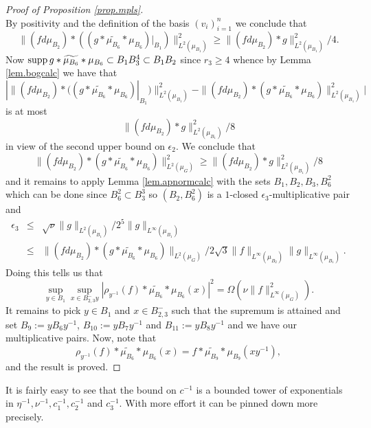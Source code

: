 \documentclass[12pt]{amsart}
\numberwithin{equation}{section}
\theoremstyle{plain}
\theoremstyle{definition}
\renewcommand{\leq}{\leqslant}
\renewcommand{\geq}{\geqslant}
\providecommand{\supp}{\mathop{\rm supp}\nolimits}
\begin{document}
\begin{proof}[Proof of Proposition \ref{prop.mpls}]
\begin{equation*}
\end{equation*}
By positivity and the definition of the basis $(v_i)_{i=1}^n$ we conclude that
\begin{equation*}
\|(fd\mu_{B_2}) \ast ((g \ast \widetilde{\mu_{B_6}} \ast \mu_{B_6})|_{B_1})\|_{L^2(\mu_{B_1})}^2\geq \|(fd\mu_{B_2}) \ast g \|_{L^2(\mu_{B_1})}^2/4.
\end{equation*}
Now $\supp g \ast \widetilde{\mu_{B_6}} \ast \mu_{B_6}\subset B_1B_3^4 \subset B_1B_2$ since $r_3 \geq 4$ whence by Lemma \ref{lem.bogcalc} we have that
\begin{equation*}
|\|(fd\mu_{B_2}) \ast ((g \ast \widetilde{\mu_{B_6}} \ast \mu_{B_6})|_{B_1})\|_{L^2(\mu_{B_1})}^2-\|(fd\mu_{B_2}) \ast (g \ast \widetilde{\mu_{B_6}} \ast \mu_{B_6})\|_{L^2(\mu_{B_1})}^2|
\end{equation*}
is at most
\begin{equation*}
\|(fd\mu_{B_2}) \ast g \|_{L^2(\mu_{B_1})}^2/8
\end{equation*}
in view of the second upper bound on $\epsilon_2$.  We conclude that
\begin{equation*}
\|(fd\mu_{B_2}) \ast (g \ast \widetilde{\mu_{B_6}} \ast \mu_{B_6})\|_{L^2(\mu_{G})}^2\geq \|(fd\mu_{B_2}) \ast g \|_{L^2(\mu_{B_1})}^2/8
\end{equation*}
and it remains to apply Lemma \ref{lem.apnormcalc} with the sets $B_1,B_2,B_3,B_6^2$ which can be done since $B_6^2\subset B_3^{3}$ so $(B_2,B_6^2)$ is a $1$-closed $\epsilon_3$-multiplicative pair and
\begin{eqnarray*}
\epsilon_3 & \leq & \sqrt{\nu}\|g\|_{L^2(\mu_{B_1})}/2^5\|g\|_{L^\infty(\mu_{B_1})}\\ & \leq & \|(fd\mu_{B_2}) \ast (g \ast \widetilde{\mu_{B_6}} \ast \mu_{B_6})\|_{L^2(\mu_{G})}/2\sqrt{3}\|f\|_{L^\infty(\mu_{B_2})}\|g\|_{L^\infty(\mu_{B_1})}.
\end{eqnarray*}
Doing this tells us that
\begin{equation*}
\sup_{y \in {B_1}}{\sup_{x \in B_{2,3}^-y}{|\rho_{y^{-1}}(f) \ast \widetilde{\mu_{B_6}} \ast \mu_{B_6}(x)|^2}} =\Omega(\nu \|f\|_{L^\infty(\mu_G)}^2).
\end{equation*}
It remains to pick $y \in B_1$ and $x \in B_{2,3}^-$ such that the supremum is attained and set $B_9:=yB_6y^{-1}$, $B_{10}:=yB_7y^{-1}$ and $B_{11}:=yB_8y^{-1}$ and we have our multiplicative pairs.  Now, note that
\begin{equation*}
\rho_{y^{-1}}(f) \ast \widetilde{\mu_{B_6}} \ast \mu_{B_6}(x) = f \ast \widetilde{\mu_{B_9}} \ast \mu_{B_9}(xy^{-1}),
\end{equation*}
and the result is proved.
\end{proof}
It is fairly easy to see that the bound on $c^{-1}$ is a bounded tower of exponentials in $\eta^{-1},\nu^{-1},c_1^{-1},c_2^{-1}$ and $c_3^{-1}$.  With more effort it can be pinned down more precisely.
\end{document}

